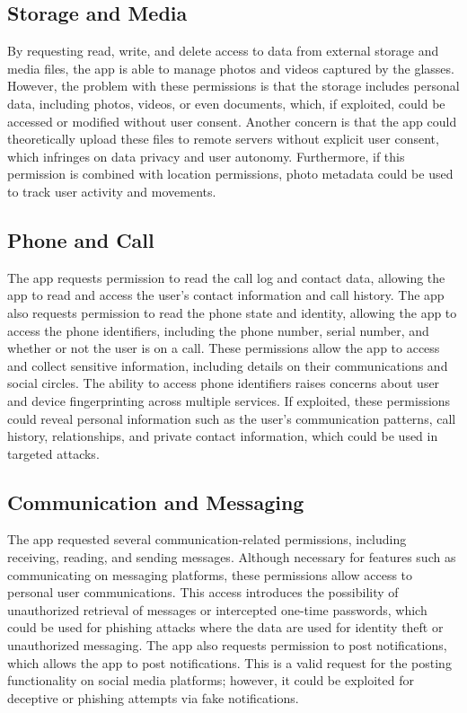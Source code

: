 \subsection*{Storage and Media}
By requesting read, write, and delete access to data from external storage and media files, the app is able to manage photos and videos captured by the glasses. However, the problem with these permissions is that the storage includes personal data, including photos, videos, or even documents, which, if exploited, could be accessed or modified without user consent. Another concern is that the app could theoretically upload these files to remote servers without explicit user consent, which infringes on data privacy and user autonomy. Furthermore, if this permission is combined with location permissions, photo metadata could be used to track user activity and movements.

\subsection*{Phone and Call}
The app requests permission to read the call log and contact data, allowing the app to read and access the user's contact information and call history. The app also requests permission to read the phone state and identity, allowing the app to access the phone identifiers, including the phone number, serial number, and whether or not the user is on a call. These permissions allow the app to access and collect sensitive information, including details on their communications and social circles. The ability to access phone identifiers raises concerns about user and device fingerprinting across multiple services. If exploited, these permissions could reveal personal information such as the user's communication patterns, call history, relationships, and private contact information, which could be used in targeted attacks. 

\subsection*{Communication and Messaging}
The app requested several communication-related permissions, including receiving, reading, and sending messages. Although necessary for features such as communicating on messaging platforms, these permissions allow access to personal user communications. This access introduces the possibility of unauthorized retrieval of messages or intercepted one-time passwords, which could be used for phishing attacks where the data are used for identity theft or unauthorized messaging. The app also requests permission to post notifications, which allows the app to post notifications. This is a valid request for the posting functionality on social media platforms; however, it could be exploited for deceptive or phishing attempts via fake notifications.

